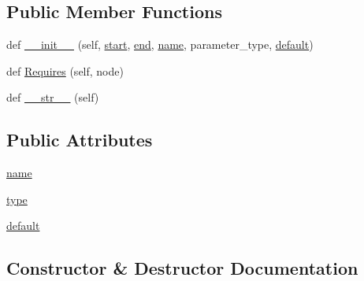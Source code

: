 \subsection*{Public Member Functions}
\begin{DoxyCompactItemize}
\item 
def \hyperlink{classcpp_1_1ast_1_1Parameter_a4fe27f559d44adac9e9b5898ba76c5b3}{\+\_\+\+\_\+init\+\_\+\+\_\+} (self, \hyperlink{classcpp_1_1ast_1_1Node_a7b2aa97e6a049bb1a93aea48c48f1f44}{start}, \hyperlink{classcpp_1_1ast_1_1Node_a3c5e5246ccf619df28eca02e29d69647}{end}, \hyperlink{classcpp_1_1ast_1_1Parameter_aae0375fb0ded8fa9090feea6bdff2784}{name}, parameter\+\_\+type, \hyperlink{classcpp_1_1ast_1_1Parameter_a4ceae2ac87d82c5542c4e7385eb4c97e}{default})
\item 
def \hyperlink{classcpp_1_1ast_1_1Parameter_a4bc5c17a0d606d35be40cb4c2c1a67a6}{Requires} (self, node)
\item 
def \hyperlink{classcpp_1_1ast_1_1Parameter_aabfbabb3c744a0da4a012ceb4299947a}{\+\_\+\+\_\+str\+\_\+\+\_\+} (self)
\end{DoxyCompactItemize}
\subsection*{Public Attributes}
\begin{DoxyCompactItemize}
\item 
\hyperlink{classcpp_1_1ast_1_1Parameter_aae0375fb0ded8fa9090feea6bdff2784}{name}
\item 
\hyperlink{classcpp_1_1ast_1_1Parameter_a5eed090000c41551a10c21f175ad33e3}{type}
\item 
\hyperlink{classcpp_1_1ast_1_1Parameter_a4ceae2ac87d82c5542c4e7385eb4c97e}{default}
\end{DoxyCompactItemize}


\subsection{Constructor \& Destructor Documentation}
